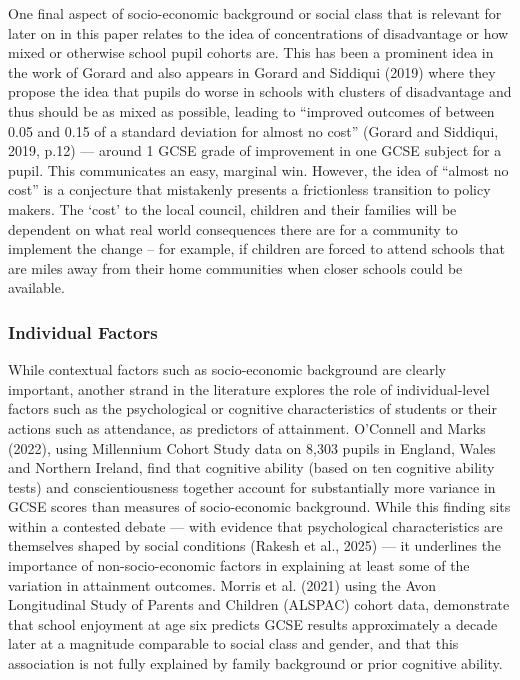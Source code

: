 \documentclass[
  11pt,
]{article}
\begin{document}
One final aspect of socio-economic background or social class that is
relevant for later on in this paper relates to the idea of
concentrations of disadvantage or how mixed or otherwise school pupil
cohorts are. This has been a prominent idea in the work of Gorard and
also appears in Gorard and Siddiqui (2019) where they propose the idea
that pupils do worse in schools with clusters of disadvantage and thus
should be as mixed as possible, leading to ``improved outcomes of
between 0.05 and 0.15 of a standard deviation for almost no cost''
(Gorard and Siddiqui, 2019, p.12) --- around 1 GCSE grade of improvement
in one GCSE subject for a pupil. This communicates an easy, marginal
win. However, the idea of ``almost no cost'' is a conjecture that
mistakenly presents a frictionless transition to policy makers. The
`cost' to the local council, children and their families will be
dependent on what real world consequences there are for a community to
implement the change -- for example, if children are forced to attend
schools that are miles away from their home communities when closer
schools could be available.

\subsubsection{Individual Factors}\label{individual-factors}

While contextual factors such as socio-economic background are clearly
important, another strand in the literature explores the role of
individual-level factors such as the psychological or cognitive
characteristics of students or their actions such as attendance, as
predictors of attainment. O'Connell and Marks (2022), using Millennium
Cohort Study data on 8,303 pupils in England, Wales and Northern
Ireland, find that cognitive ability (based on ten cognitive ability
tests) and conscientiousness together account for substantially more
variance in GCSE scores than measures of socio-economic background.
While this finding sits within a contested debate --- with evidence that
psychological characteristics are themselves shaped by social conditions
(Rakesh et al., 2025) --- it underlines the importance of
non-socio-economic factors in explaining at least some of the variation
in attainment outcomes. Morris et al. (2021) using the Avon Longitudinal
Study of Parents and Children (ALSPAC) cohort data, demonstrate that
school enjoyment at age six predicts GCSE results approximately a decade
later at a magnitude comparable to social class and gender, and that
this association is not fully explained by family background or prior
cognitive ability.
\end{document}
